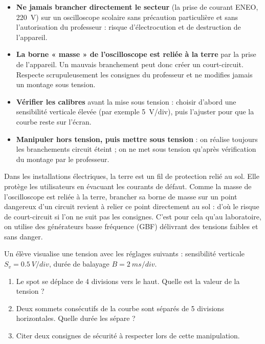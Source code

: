 \documentclass[11pt]{article}
\newcommand{\cle}[1]{{\popxbold\color{popdark}#1}}
\begin{document}
\begin{attention}
\begin{itemize}
\item \textbf{Ne jamais brancher directement le secteur} (la prise de courant ENEO, \SI{220}{V}) sur un oscilloscope scolaire sans précaution particulière et sans l'autorisation du professeur : risque d'électrocution et de destruction de l'appareil.
\item \textbf{La borne « masse » de l'oscilloscope est reliée à la terre} par la prise de l'appareil. Un mauvais branchement peut donc créer un court-circuit. Respecte scrupuleusement les consignes du professeur et ne modifies jamais un montage sous tension.
\item \textbf{Vérifier les calibres} avant la mise sous tension : choisir d'abord une sensibilité verticale élevée (par exemple \SI{5}{V/div}), puis l'ajuster pour que la courbe reste sur l'écran.
\item \textbf{Manipuler hors tension, puis mettre sous tension} : on réalise toujours les branchements circuit éteint ; on ne met sous tension qu'après vérification du montage par le professeur.
\end{itemize}
\end{attention}

\begin{savaistu}
Dans les installations électriques, la \cle{terre} est un fil de protection relié au sol. Elle protège les utilisateurs en évacuant les courants de défaut. Comme la masse de l'oscilloscope est reliée à la terre, brancher sa borne de masse sur un point dangereux d'un circuit revient à relier ce point directement au sol : d'où le risque de court-circuit si l'on ne suit pas les consignes. C'est pour cela qu'au laboratoire, on utilise des générateurs basse fréquence (GBF) délivrant des tensions faibles et sans danger.
\end{savaistu}

\begin{exercice}
Un élève visualise une tension avec les réglages suivants : sensibilité verticale $S_v = \SI{0,5}{V/div}$, durée de balayage $B = \SI{2}{ms/div}$.
\begin{enumerate}
\item Le spot se déplace de 4 divisions vers le haut. Quelle est la valeur de la tension ?
\item Deux sommets consécutifs de la courbe sont séparés de 5 divisions horizontales. Quelle durée les sépare ?
\item Citer deux consignes de sécurité à respecter lors de cette manipulation.
\end{enumerate}
\end{exercice}
\end{document}
